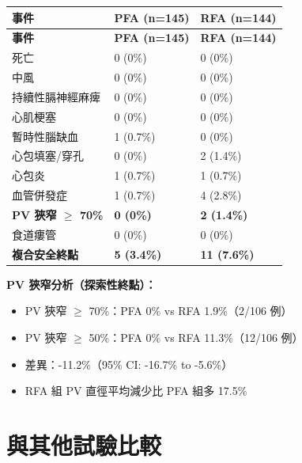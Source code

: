 \documentclass[12pt,a4paper]{article}
\begin{document}
\begin{longtable}{p{7cm}p{3cm}p{3cm}}
\toprule
\textbf{事件} & \textbf{PFA (n=145)} & \textbf{RFA (n=144)} \\
\midrule
\endfirsthead
\midrule
\textbf{事件} & \textbf{PFA (n=145)} & \textbf{RFA (n=144)} \\
\midrule
\endhead
\bottomrule
\endfoot
死亡 & 0 (0\%) & 0 (0\%) \\
\midrule
中風 & 0 (0\%) & 0 (0\%) \\
\midrule
持續性膈神經麻痺 & 0 (0\%) & 0 (0\%) \\
\midrule
心肌梗塞 & 0 (0\%) & 0 (0\%) \\
\midrule
暫時性腦缺血 & 1 (0.7\%) & 0 (0\%) \\
\midrule
心包填塞/穿孔 & 0 (0\%) & 2 (1.4\%) \\
\midrule
心包炎 & 1 (0.7\%) & 1 (0.7\%) \\
\midrule
血管併發症 & 1 (0.7\%) & 4 (2.8\%) \\
\midrule
\textbf{PV 狹窄 $\geq$ 70\%} & \textbf{0 (0\%)} & \textbf{2 (1.4\%)} \\
\midrule
食道瘻管 & 0 (0\%) & 0 (0\%) \\
\midrule
\textbf{複合安全終點} & \textbf{5 (3.4\%)} & \textbf{11 (7.6\%)} \\
\bottomrule
\end{longtable}

\begin{importantbox}
\textbf{PV 狹窄分析（探索性終點）：}
\begin{itemize}[noitemsep]
    \item PV 狹窄 $\geq$ 70\%：PFA 0\% vs RFA 1.9\%（2/106 例）
    \item PV 狹窄 $\geq$ 50\%：PFA 0\% vs RFA 11.3\%（12/106 例）
    \item 差異：-11.2\%（95\% CI: -16.7\% to -5.6\%）
    \item RFA 組 PV 直徑平均減少比 PFA 組多 17.5\%
\end{itemize}
\end{importantbox}

\section{與其他試驗比較}
\end{document}
